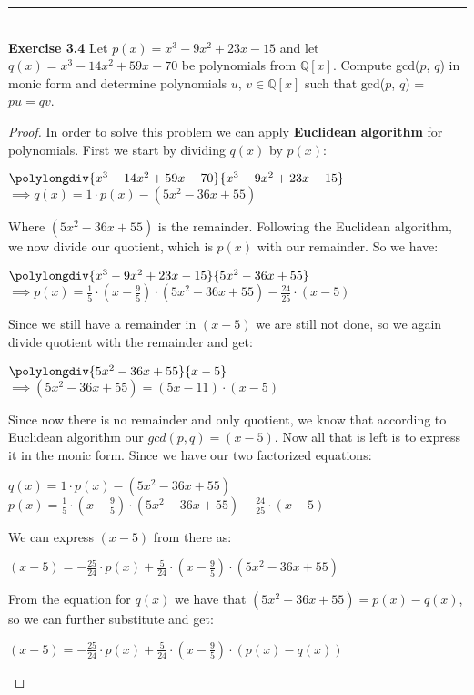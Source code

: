 \documentclass{article}
\begin{document}
\noindent\rule{12cm}{0.4pt}\\
\noindent \textbf{Exercise 3.4} Let $p(x) = x^3 - 9x^2 + 23x - 15$ and let $q(x) = x^3 - 14x^2 + 59x - 70$ be polynomials from $\mathbb{Q}[x]$. Compute gcd($p$, $q$) in monic form and determine polynomials $u$, $v \in \mathbb{Q}[x]$ such that gcd($p$, $q$) = $pu = qv$.
\begin{proof}
In order to solve this problem we can apply \textbf{Euclidean algorithm} for polynomials. First we start by dividing $q(x)$ by $p(x)$:
\begin{center}
$\polylongdiv{x^3 - 14x^2 + 59x - 70}{x^3 - 9x^2 + 23x - 15}$\\
$\implies q(x) = 1 \cdot p(x) - (5x^2 - 36x + 55)$
\end{center}
Where $(5x^2 - 36x + 55)$ is the remainder. Following the Euclidean algorithm, we now divide our quotient, which is $p(x)$ with our remainder. So we have:
\begin{center}
$\polylongdiv{x^3 - 9x^2 + 23x - 15}{5x^2 - 36x + 55}$\\
$ \implies p(x) = \frac{1}{5} \cdot (x - \frac{9}{5}) \cdot (5x^2 - 36x + 55) - \frac{24}{25} \cdot (x-5)$
\end{center}
Since we still have a remainder in $(x-5)$ we are still not done, so we again divide quotient with the remainder and get:
\begin{center}
$\polylongdiv{5x^2 - 36x + 55}{x-5}$\\
$\implies (5x^2 - 36x + 55) = (5x - 11) \cdot (x-5)$
\end{center}
Since now there is no remainder and only quotient, we know that according to Euclidean algorithm our $gcd(p,q)= (x-5)$. Now all that is left is to express it in the monic form. Since we have our two factorized equations:
\begin{center}
$q(x) = 1 \cdot p(x) - (5x^2 - 36x + 55)$\\
$p(x) = \frac{1}{5} \cdot (x - \frac{9}{5}) \cdot (5x^2 - 36x + 55) - \frac{24}{25} \cdot (x-5)$
\end{center}
We can express $(x-5)$ from there as:
\begin{center}
$(x-5) = -\frac{25}{24}  \cdot p(x) + \frac{5}{24} \cdot (x - \frac{9}{5}) \cdot (5x^2 - 36x + 55)$	
\end{center}
From the equation for $q(x)$ we have that $(5x^2 - 36x + 55) = p(x) - q(x)$, so we can further substitute and get:
\begin{center}
$(x-5) = -\frac{25}{24} \cdot p(x) + \frac{5}{24} \cdot (x - \frac{9}{5}) \cdot (p(x)-q(x))$\\

\end{center}
\end{proof}
\end{document}
